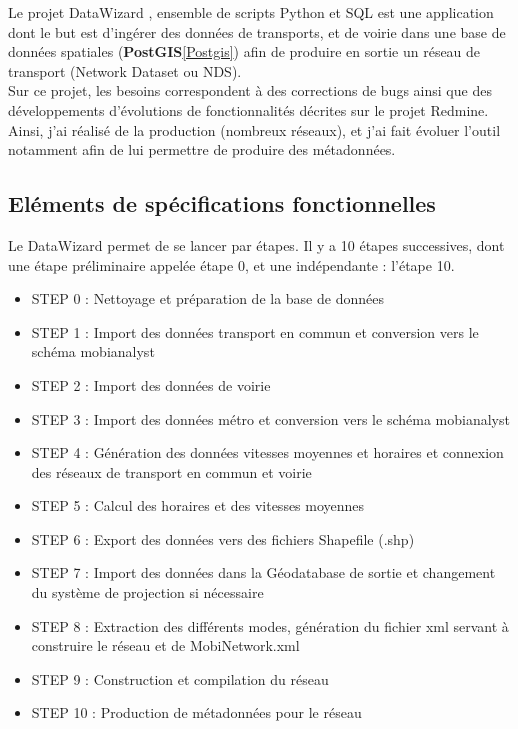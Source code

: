 \begin{itemize}
Le projet \og DataWizard \fg, ensemble de scripts Python et SQL est une application dont le but est d'ingérer des données de transports, et de voirie dans une base de données spatiales (\textbf{PostGIS}\ref{Postgis}) afin de produire en sortie un réseau de transport (Network Dataset ou NDS).\\
Sur ce projet, les besoins correspondent à des corrections de bugs ainsi que des développements d'évolutions de fonctionnalités décrites sur le projet Redmine. Ainsi, j'ai réalisé de la production (nombreux réseaux), et j'ai fait évoluer l'outil notamment afin de lui permettre de produire des métadonnées.\\


\subsection{Eléments de spécifications fonctionnelles}

Le DataWizard permet de se lancer par étapes. Il y a 10 étapes successives, dont une étape préliminaire appelée étape 0, et une indépendante : l'étape 10.\\
\begin{itemize}
\item STEP 0 : Nettoyage et préparation de la base de données
\item STEP 1 : Import des données transport en commun et conversion vers le schéma mobianalyst
\item STEP 2 : Import des données de voirie
\item STEP 3 : Import des données métro et conversion vers le schéma mobianalyst
\item STEP 4 : Génération des données vitesses moyennes et horaires et connexion des réseaux de transport en commun et voirie
\item STEP 5 : Calcul des horaires et des vitesses moyennes
\item STEP 6 : Export des données vers des fichiers Shapefile (.shp)
\item STEP 7 : Import des données dans la Géodatabase de sortie et changement du système de projection si nécessaire
\item STEP 8 : Extraction des différents modes, génération du fichier xml servant à construire le réseau et de MobiNetwork.xml
\item STEP 9 : Construction et compilation du réseau
\item STEP 10 : Production de métadonnées pour le réseau
\end{itemize}


\end{itemize}
